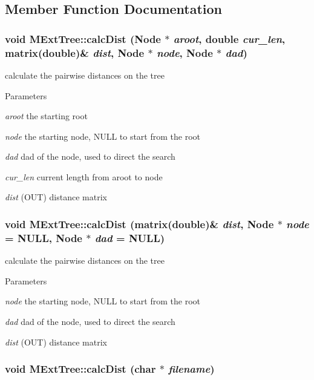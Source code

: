 \subsection{Member Function Documentation}
\hypertarget{classMExtTree_a0519ce518addd2ada2794e16436491f3}{
\subsubsection[{calcDist}]{\setlength{\rightskip}{0pt plus 5cm}void MExtTree::calcDist ({\bf Node} $\ast$ {\em aroot}, \/  double {\em cur\_\-len}, \/  matrix(double)\& {\em dist}, \/  {\bf Node} $\ast$ {\em node}, \/  {\bf Node} $\ast$ {\em dad})}}
\label{classMExtTree_a0519ce518addd2ada2794e16436491f3}
calculate the pairwise distances on the tree 
\begin{DoxyParams}{Parameters}
\item[{\em aroot}]the starting root \item[{\em node}]the starting node, NULL to start from the root \item[{\em dad}]dad of the node, used to direct the search \item[{\em cur\_\-len}]current length from aroot to node \item[{\em dist}](OUT) distance matrix \end{DoxyParams}
\hypertarget{classMExtTree_a283c7b86a9755f4cc4ec0c9fa7787a48}{
\subsubsection[{calcDist}]{\setlength{\rightskip}{0pt plus 5cm}void MExtTree::calcDist (matrix(double)\& {\em dist}, \/  {\bf Node} $\ast$ {\em node} = {\ttfamily NULL}, \/  {\bf Node} $\ast$ {\em dad} = {\ttfamily NULL})}}
\label{classMExtTree_a283c7b86a9755f4cc4ec0c9fa7787a48}
calculate the pairwise distances on the tree 
\begin{DoxyParams}{Parameters}
\item[{\em node}]the starting node, NULL to start from the root \item[{\em dad}]dad of the node, used to direct the search \item[{\em dist}](OUT) distance matrix \end{DoxyParams}
\hypertarget{classMExtTree_ab89f62be12aaaf2b63ddbef4e8750b38}{
\subsubsection[{calcDist}]{\setlength{\rightskip}{0pt plus 5cm}void MExtTree::calcDist (char $\ast$ {\em filename})}}
